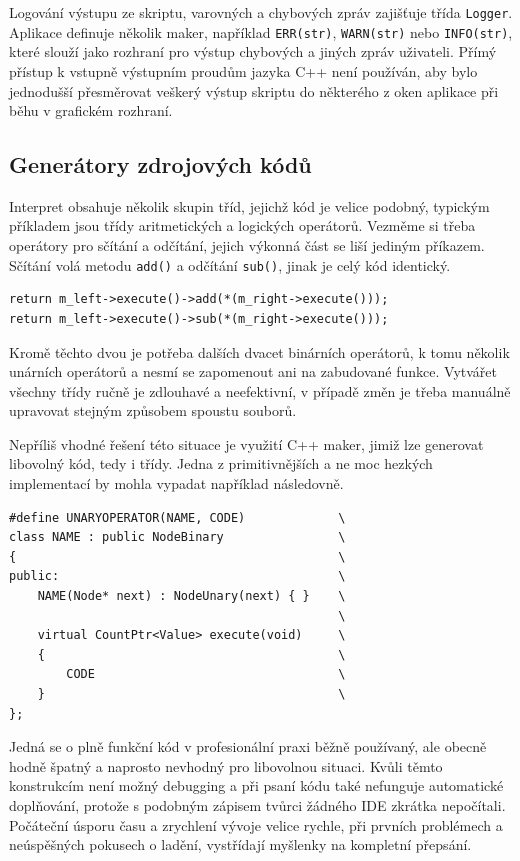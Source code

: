 \documentclass[11pt,twoside,a4paper]{book}
\begin{document}
Logování výstupu ze skriptu, varovných a chybových zpráv zajišťuje třída \texttt{Logger}. Aplikace definuje několik maker, například \texttt{ERR(str)}, \texttt{WARN(str)} nebo \texttt{INFO(str)}, které slouží jako rozhraní pro výstup chybových a jiných zpráv uživateli. Přímý přístup k vstupně výstupním proudům jazyka C++ není používán, aby bylo jednodušší přesměrovat veškerý výstup skriptu do některého z oken aplikace při běhu v grafickém rozhraní.


\subsection{Generátory zdrojových kódů}

Interpret obsahuje několik skupin tříd, jejichž kód je velice podobný, typickým příkladem jsou třídy aritmetických a logických operátorů. Vezměme si třeba operátory pro sčítání a odčítání, jejich výkonná část se liší jediným příkazem. Sčítání volá metodu \texttt{add()} a odčítání \texttt{sub()}, jinak je celý kód identický.

\begin{verbatim}
return m_left->execute()->add(*(m_right->execute()));
return m_left->execute()->sub(*(m_right->execute()));
\end{verbatim}

Kromě těchto dvou je potřeba dalších dvacet binárních operátorů, k tomu několik unárních operátorů a nesmí se zapomenout ani na zabudované funkce. Vytvářet všechny třídy ručně je zdlouhavé a neefektivní, v případě změn je třeba manuálně upravovat stejným způsobem spoustu souborů.

Nepříliš vhodné řešení této situace je využití C++ maker, jimiž lze generovat libovolný kód, tedy i třídy. Jedna z primitivnějších a ne moc hezkých implementací by mohla vypadat například následovně.

\begin{verbatim}
#define UNARYOPERATOR(NAME, CODE)             \
class NAME : public NodeBinary                \
{                                             \
public:                                       \
    NAME(Node* next) : NodeUnary(next) { }    \
                                              \
    virtual CountPtr<Value> execute(void)     \
    {                                         \
        CODE                                  \
    }                                         \
};
\end{verbatim}

Jedná se o plně funkční kód v profesionální praxi běžně používaný, ale obecně hodně špatný a naprosto nevhodný pro libovolnou situaci. Kvůli těmto konstrukcím není možný debugging a při psaní kódu také nefunguje automatické do\-pl\-ňo\-vá\-ní, protože s podobným zápisem tvůrci žádného IDE zkrátka nepočítali. Počáteční úsporu času a zrychlení vývoje velice rychle, při prvních problémech a neúspěšných pokusech o ladění, vystřídají myšlenky na kompletní přepsání.
\end{document}
